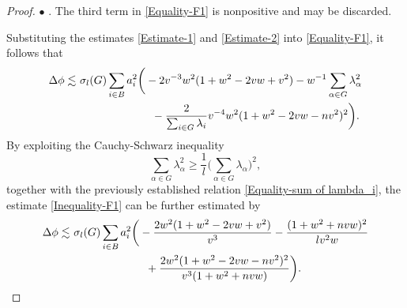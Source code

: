\documentclass[11pt]{amsart}
\newcommand{\circled}[1]{
  \tikz[baseline=(char.base)]{
    \node[shape=circle,draw,inner sep=1pt] (char) {#1};
  }
}
\numberwithin{theorem}{section}
\numberwithin{equation}{section}
\begin{document}
\begin{proof}
$\bullet$ \circled{3}. The third term \circled{3} in \eqref{Equality-F1} is nonpositive and may be discarded.

Substituting the estimates \eqref{Estimate-1} and \eqref{Estimate-2} into \eqref{Equality-F1}, it follows that
\begin{equation}\label{Inequality-F1}
\begin{aligned}
\Delta\phi
\lesssim&~\sigma_l(G)\sum_{i\in B}a_i^2\bigg(-2v^{-3}w^2(1+w^2-2vw+v^2)-w^{-1}\sum_{\alpha\in G}\lambda_\alpha^2\\
&\hspace{2.4cm}-\frac{2}{\sum_{i\in G}\lambda_i}v^{-4}w^2(1+w^2-2vw-nv^2)^2\bigg).
\end{aligned}
\end{equation}
By exploiting the Cauchy-Schwarz inequality $$\sum_{\alpha\in G}\lambda_\alpha^2\geq\frac{1}{l}\big(\sum_{\alpha\in G}\lambda_\alpha\big)^2,$$ together with the previously established relation \eqref{Equality-sum of lambda_i}, the estimate \eqref{Inequality-F1} can be further estimated by
\begin{align*}
\Delta\phi
\lesssim&~\sigma_l(G)\sum_{i\in B}a_i^2\bigg(-\frac{2w^2(1+w^2-2vw+v^2)}{v^3}-\frac{(1+w^2+nvw)^2}{lv^2w}\\
&\hspace{2.4cm}+\frac{2w^2(1+w^2-2vw-nv^2)^2}{v^3(1+w^2+nvw)}\bigg).
\end{align*}


\end{proof}
\end{document}
